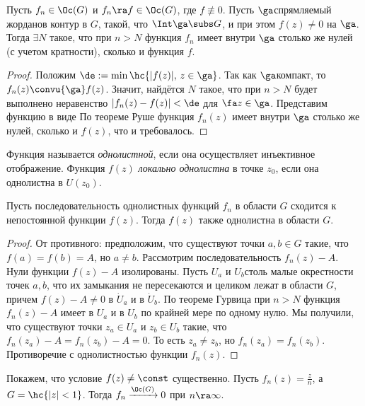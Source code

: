 \documentclass[a4paper]{article}
\begin{document}
\begin{theorem}
\begin{theorem}
Пусть $f_n \in\Oc(G)$ и $f_n \ra f \in \Oc(G)$, где $f\not \equiv 0$.
Пусть $\ga$\т спрямляемый жорданов контур в $G$, такой, что $\Int \ga \subs G$, и
при этом $f(z) \neq 0$ на $\ga$. Тогда $\exi N$ такое, что при $n > N$ функция $f_n$ имеет внутри $\ga$ столько
же нулей (с учетом кратности), сколько и функция $f$.
\end{theorem}
\begin{proof}
Положим $\de := \min \hc{|f(z)|,\, z \in \ga}$.
Так как $\ga$\т компакт, то $f_n(z) \convu{\ga} f(z)$. Значит, найдётся $N$ такое, что при $n > N$
будет выполнено неравенство $|f_n(z)-f(z)|<\de$ для $\fa z \in \ga$.
Представим функцию в виде
По теореме Руше функция $f_n(z)$  имеет внутри $\ga$  столько же нулей, сколько и $f(z)$,  что и требовалось.
\end{proof}

\begin{df}
Функция называется \emph{однолистной}, если она осуществляет инъективное отображение.
Функция $f(z)$ \emph{локально однолистна} в точке $z_0$, если она однолистна в $U(z_0)$.
\end{df}

\begin{theorem}
Пусть последовательность однолистных функций $f_n$ в области $G$ сходится к непостоянной функции $f(z)$.
Тогда $f(z)$ также однолистна в области $G$.
\end{theorem}
\begin{proof}
От противного: предположим, что существуют точки $a, b\in G$ такие, что $f(a)=f(b)=A$, но $a\neq b$.
Рассмотрим последовательность $f_n(z) - A$.
Нули функции $f(z)-A$ изолированы. Пусть $U_a$ и $U_b$\т столь малые окрестности точек $a,b$, что их
замыкания не пересекаются и целиком лежат в области $G$, причем $f(z)-A\neq 0$ в $\dot U_a$ и в $\dot U_b$.
По теореме Гурвица при $n>N$ функция $f_n(z)-A$ имеет в $U_a$ и в $U_b$ по крайней мере по одному нулю.
Мы получили, что существуют точки $z_a \in U_a$ и $z_b \in U_b$ такие, что $f_n(z_a)-A=f_n(z_b)-A=0$. То есть
$z_a \neq z_b$, но $f_n(z_a)=f_n(z_b)$. Противоречие с однолистностью функции $f_n(z)$.
\end{proof}

\begin{ex}
Покажем, что условие $f(z)\neq\const$ существенно.
Пусть $f_n(z)=\frac{z}{n}$, а $G = \hc{|z| < 1}$. Тогда $f_n \xrightarrow{\Oc(G)} 0$ при $n\ra \infty$.
\end{ex}


\end{theorem}
\end{document}
